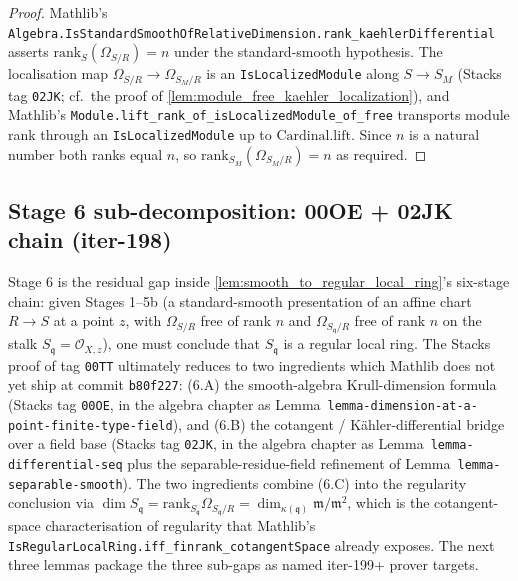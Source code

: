 \begin{proof}
  Mathlib's
  \texttt{Algebra.IsStandardSmoothOfRelativeDimension.\linebreak rank\_kaehlerDifferential}
  asserts \(\mathrm{rank}_S(\Omega_{S/R}) = n\) under the
  standard-smooth hypothesis. The localisation map
  \(\Omega_{S/R} \to \Omega_{S_M/R}\) is an
  \texttt{IsLocalizedModule} along \(S \to S_M\) (Stacks tag
  \texttt{02JK}; cf.\ the proof of
  \cref{lem:module_free_kaehler_localization}), and Mathlib's
  \texttt{Module.lift\_rank\_of\_isLocalizedModule\_of\_free} transports
  module rank through an \texttt{IsLocalizedModule} up to
  \(\mathrm{Cardinal.lift}\). Since \(n\) is a natural number both
  ranks equal \(n\), so
  \(\mathrm{rank}_{S_M}(\Omega_{S_M / R}) = n\) as required.
\end{proof}

\subsection{Stage 6 sub-decomposition: 00OE + 02JK chain (iter-198)}
\label{subsec:stage6_subgap_decomposition}

Stage 6 is the residual gap inside
\cref{lem:smooth_to_regular_local_ring}'s six-stage chain: given Stages
1--5b (a standard-smooth presentation of an affine chart
\(R \to S\) at a point \(z\), with \(\Omega_{S/R}\) free of rank \(n\)
and \(\Omega_{S_\mathfrak q / R}\) free of rank \(n\) on the stalk
\(S_\mathfrak q = \mathcal O_{X, z}\)), one must conclude that
\(S_\mathfrak q\) is a regular local ring. The Stacks proof of tag
\texttt{00TT} ultimately reduces to two ingredients which Mathlib does
not yet ship at commit \texttt{b80f227}: (6.A) the smooth-algebra
Krull-dimension formula (Stacks tag \texttt{00OE}, in the algebra
chapter as Lemma~\texttt{lemma-dimension-at-a-point-finite-type-field}),
and (6.B) the cotangent / K\"ahler-differential bridge over a field
base (Stacks tag \texttt{02JK}, in the algebra chapter as
Lemma~\texttt{lemma-differential-seq} plus the separable-residue-field
refinement of Lemma~\texttt{lemma-separable-smooth}). The two
ingredients combine (6.C) into the regularity conclusion via
\(\dim S_\mathfrak q = \mathrm{rank}_{S_\mathfrak q}\Omega_{S_\mathfrak
q / R} = \dim_{\kappa(\mathfrak q)} \mathfrak m / \mathfrak m^2\),
which is the cotangent-space characterisation of regularity that
Mathlib's \texttt{IsRegularLocalRing.iff\_finrank\_cotangentSpace}
already exposes. The next three lemmas package the three sub-gaps as
named iter-199+ prover targets.

